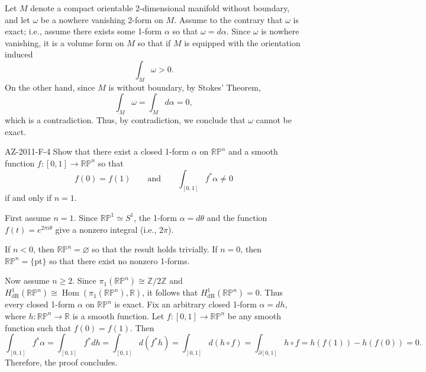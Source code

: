 \documentclass{article}
\begin{document}
	Let $M$ denote a compact orientable 2-dimensional manifold without boundary, and let $\omega$ be a nowhere vanishing 2-form on $M$. Assume to the contrary that $\omega$ is exact; i.e., assume there exists some 1-form $\alpha$ so that $\omega = d\alpha$. Since $\omega$ is nowhere vanishing, it is a volume form on $M$ so that if $M$ is equipped with the orientation induced 
	\begin{equation*}
		\int_{M}\omega > 0. 
	\end{equation*}
	On the other hand, since $M$ is without boundary, by Stokes' Theorem, 
	\begin{equation*}
		\int_{M}\omega = \int_{M}d\alpha = 0, 
	\end{equation*}
	which is a contradiction. Thus, by contradiction, we conclude that $\omega$ cannot be exact. 
	
	\begin{prb}{AZ-2011-F-4}
		Show that there exist a closed 1-form $\alpha$ on $\mathbb{RP}^{n}$ and a smooth function $f: [0,1] \to \mathbb{RP}^{n}$ so that 
		\begin{equation*}
			f(0) = f(1) \qquad \text{and} \qquad \int_{[0,1]}f^{\ast}\alpha \neq 0
		\end{equation*}
		if and only if $n = 1$. 
	\end{prb}
	First assume $n = 1$. Since $\mathbb{RP}^{1} \simeq S^{1}$, the 1-form $\alpha = d\theta$ and the function $f(t) = e^{2\pi i \theta}$ give a nonzero integral (i.e., $2\pi$). 
	
	If $n < 0$, then $\mathbb{RP}^{n} = \varnothing$ so that the result holds trivially. If $n = 0$, then $\mathbb{RP}^{n} = \{\text{pt}\}$ so that there exist no nonzero 1-forms. 
	
	Now assume $n \geq 2$. Since $\pi_{1}(\mathbb{RP}^{n}) \cong \mathbb{Z}/2\mathbb{Z}$ and $H^{1}_{\text{dR}}(\mathbb{RP}^{n}) \cong \operatorname{Hom}(\pi_{1}(\mathbb{RP}^{n}), \mathbb{R})$, it follows that $H^{1}_{\text{dR}}(\mathbb{RP}^{n}) = 0$. Thus every closed 1-form $\alpha$ on $\mathbb{RP}^{n}$ is exact. Fix an arbitrary closed 1-form $\alpha = dh$, where $h: \mathbb{RP}^{n} \to \mathbb{R}$ is a smooth function. Let $f: [0,1] \to \mathbb{RP}^{n}$ be any smooth function such that $f(0) = f(1)$. Then 
	\begin{equation*}
		\int_{[0,1]}f^{\ast}\alpha = \int_{[0,1]}f^{\ast}dh = \int_{[0,1]}d(f^{\ast}h) = \int_{[0,1]}d(h \circ f) = \int_{\partial[0,1]}h \circ f = h(f(1)) - h(f(0)) = 0. 
	\end{equation*}
	Therefore, the proof concludes. 
	
\end{document}
